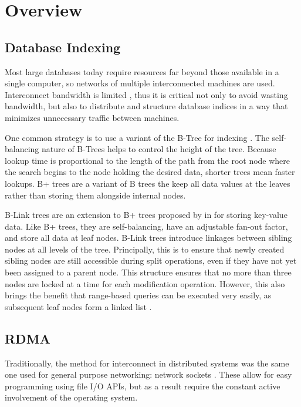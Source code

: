 \chapter{Overview}

\section{Database Indexing}
\label{sec:indexing}

Most large databases today require resources far beyond those available in a single computer, so networks of multiple interconnected machines are used. Interconnect bandwidth is limited \autocite{binnig-vldb-2016}, thus it is critical not only to avoid wasting bandwidth, but also to distribute and structure database indices in a way that minimizes unnecessary traffic between machines.

One common strategy is to use a variant of the B-Tree for indexing \autocite{ma-tpds-2022}. The self-balancing nature of B-Trees helps to control the height of the tree. Because lookup time is proportional to the length of the path from the root node where the search begins to the node holding the desired data, shorter trees mean faster lookups. B+ trees are a variant of B trees the keep all data values at the leaves rather than storing them alongside internal nodes.

B-Link trees are an extension to B+ trees proposed by \citeauthor{b-link} in \citeyear{b-link} for storing key-value data. Like B+ trees, they are self-balancing, have an adjustable fan-out factor, and store all data at leaf nodes.
B-Link trees introduce linkages between sibling nodes at all levels of the tree. Principally, this is to ensure that newly created sibling nodes are still accessible during split operations, even if they have not yet been assigned to a parent node. This structure ensures that no more than three nodes are locked at a time for each modification operation. However, this also brings the benefit that range-based queries can be executed very easily, as subsequent leaf nodes form a linked list \autocite{b-link}.


\section{RDMA}
\label{sec:rdma}

Traditionally, the method for interconnect in distributed systems was the same one used for general purpose networking: network sockets \autocite{binnig-vldb-2016}. These allow for easy programming using file I/O APIs, but as a result require the constant active involvement of the operating system.

